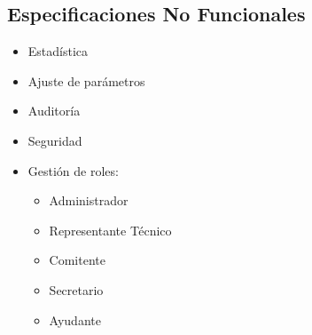 \subsection[No Funcionales]{Especificaciones No Funcionales}
\begin{itemize}
	\item Estad\'istica
	\item Ajuste de par\'ametros
	\item Auditor\'ia
	\item Seguridad
	\item Gesti\'on de roles:
	\begin{itemize}
		\item Administrador
		\item Representante T\'ecnico
		\item Comitente
		\item Secretario
		\item Ayudante
	\end{itemize}
\end{itemize}
